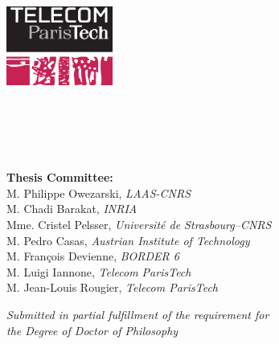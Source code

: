 \begin{titlepage}
    \begin{addmargin}[-1cm]{-3cm}
    \begin{center}
		\large
        \hfill

        \vfill

        \begingroup
            \LARGE \color{Maroon}\spacedallcaps{\myTitle} \\ \bigskip 
            \mySubtitle \\ \bigskip
        \endgroup
        
		\vfill  		
  		
		\includegraphics[width=3.5cm]{gfx/telecom.eps} \\ \bigskip
        
        \vfill
        
        {\Large \spacedlowsmallcaps{\myName}}\\ \medskip           
        
        \myDepartment \\                            
        \myUni \\ \bigskip
          
        \vfill

		{\large \textbf{Thesis Committee:}}\\
		M. Philippe Owezarski, \textit{LAAS-CNRS} \\
		M. Chadi Barakat, \textit{INRIA} \\
		Mme. Cristel Pelsser, \textit{Université de Strasbourg--CNRS}\\
		M. Pedro Casas, \textit{Austrian Institute of Technology}\\
		M. François Devienne, \textit{BORDER 6}\\
		M. Luigi Iannone, \textit{Telecom ParisTech}\\
		M. Jean-Louis Rougier, \textit{Telecom ParisTech}\\
		
		\vfill      
        
        {\normalsize \textit{Submitted in partial fulfillment of the requirement for\\
        the Degree of Doctor of Philosophy}}
        \vfill
    \end{center}
 
  \end{addmargin}       
\end{titlepage}   